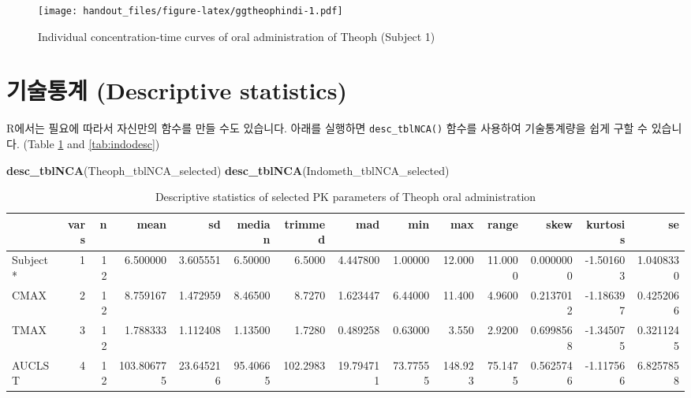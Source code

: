 \documentclass[9pt,]{krantz}
\newenvironment{Shaded}{\begin{snugshade}}{\end{snugshade}}
\newcommand{\ControlFlowTok}[1]{\textcolor[rgb]{0.13,0.29,0.53}{\textbf{#1}}}
\newcommand{\KeywordTok}[1]{\textcolor[rgb]{0.13,0.29,0.53}{\textbf{#1}}}
\newcommand{\NormalTok}[1]{#1}
\newcommand{\OperatorTok}[1]{\textcolor[rgb]{0.81,0.36,0.00}{\textbf{#1}}}
\newcommand{\StringTok}[1]{\textcolor[rgb]{0.31,0.60,0.02}{#1}}
\begin{document}
\begin{figure}
\centering
\texttt{[image: handout\_files/figure-latex/ggtheophindi-1.pdf]}
\caption{\label{fig:ggtheophindi}Individual concentration-time curves of oral administration of Theoph (Subject 1)}
\end{figure}

\hypertarget{descriptive-statistics}{%
\section{기술통계 (Descriptive statistics)}\label{descriptive-statistics}}

R에서는 필요에 따라서 자신만의 함수를 만들 수도 있습니다.
아래를 실행하면 \texttt{desc\_tblNCA()} 함수를 사용하여 기술통계량을 쉽게 구할 수 있습니다. (Table \ref{tab:theodesc} and \ref{tab:indodesc})

\begin{Shaded}
\end{Shaded}

\begin{Shaded}
\begin{Highlighting}[]
\KeywordTok{desc_tblNCA}\NormalTok{(Theoph_tblNCA_selected)}
\KeywordTok{desc_tblNCA}\NormalTok{(Indometh_tblNCA_selected)}
\end{Highlighting}
\end{Shaded}

\begin{table}[t]

\caption{\label{tab:theodesc}Descriptive statistics of selected PK parameters of Theoph oral administration}
\centering
\begin{tabular}{lrrrrrrrrrrrrr}
\toprule
  & vars & n & mean & sd & median & trimmed & mad & min & max & range & skew & kurtosis & se\\
\midrule
Subject* & 1 & 12 & 6.500000 & 3.605551 & 6.50000 & 6.5000 & 4.447800 & 1.00000 & 12.000 & 11.0000 & 0.0000000 & -1.501603 & 1.0408330\\
CMAX & 2 & 12 & 8.759167 & 1.472959 & 8.46500 & 8.7270 & 1.623447 & 6.44000 & 11.400 & 4.9600 & 0.2137012 & -1.186397 & 0.4252066\\
TMAX & 3 & 12 & 1.788333 & 1.112408 & 1.13500 & 1.7280 & 0.489258 & 0.63000 & 3.550 & 2.9200 & 0.6998568 & -1.345075 & 0.3211245\\
AUCLST & 4 & 12 & 103.806775 & 23.645216 & 95.40665 & 102.2983 & 19.794711 & 73.77555 & 148.923 & 75.1475 & 0.5625746 & -1.117566 & 6.8257858\\
\bottomrule
\end{tabular}
\end{table}
\end{document}

